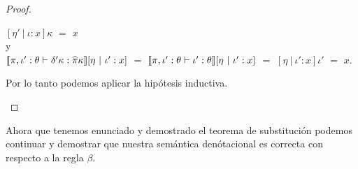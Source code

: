 \begin{proof}
\begin{itemize}
\begin{itemize}
\begin{itemize}
$[ \eta' \ | \ \iota:x ]\kappa$ $=$ $x$\\

y\\

$\llbracket \pi,\iota':\theta \vdash \delta'\kappa : \widehat{\pi}\kappa \rrbracket[ \eta \ | \ \iota':x ]$ $=$
$\llbracket \pi,\iota':\theta \vdash \iota' : \theta \rrbracket[ \eta \ | \ \iota':x ]$ $=$
$[ \eta \ | \ \iota':x ]\iota'$ $=$ $x$.

Por lo tanto podemos aplicar la hip\'otesis inductiva.\\

\end{itemize}
\end{itemize}
\end{itemize}
\end{proof}

Ahora que tenemos enunciado y demostrado el teorema de substituci\'on podemos
continuar y demostrar que nuestra sem\'antica den\'otacional es correcta 
con respecto a la regla $\beta$.

